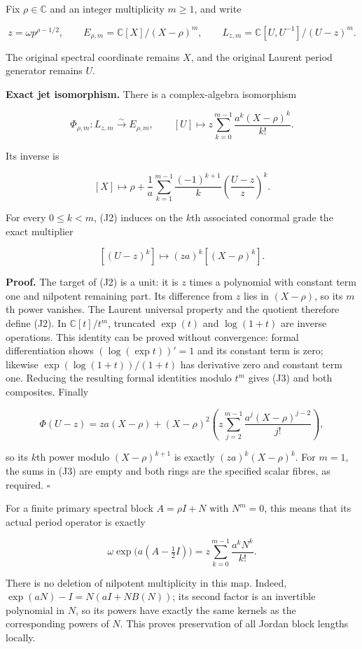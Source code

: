 Fix \(\rho\in\mathbb C\) and an integer multiplicity \(m\ge 1\), and write

\[
z=\omega p^{\rho-1/2},\qquad
E_{\rho,m}=\mathbb C[X]/(X-\rho)^m,
\qquad
L_{z,m}=\mathbb C[U,U^{-1}]/(U-z)^m.
\]

The original spectral coordinate remains \(X\), and the original Laurent period generator remains \(U\).

\textbf{Exact jet isomorphism.} There is a complex-algebra isomorphism

\[
\Phi_{\rho,m}:L_{z,m}\xrightarrow{\sim}E_{\rho,m},
\qquad
[U]\longmapsto z\sum_{k=0}^{m-1}\frac{a^k(X-\rho)^k}{k!}.
\tag{J2}
\]

Its inverse is

\[
[X]\longmapsto\rho+
\frac1a\sum_{k=1}^{m-1}\frac{(-1)^{k+1}}k
\left(\frac{U-z}{z}\right)^k.
\tag{J3}
\]

For every \(0\le k<m\), (J2) induces on the \(k\)th associated conormal grade the exact multiplier

\[
[(U-z)^k]\longmapsto (za)^k[(X-\rho)^k].
\tag{J4}
\]

\textbf{Proof.} The target of (J2) is a unit: it is \(z\) times a polynomial with constant term one and nilpotent remaining part. Its difference from \(z\) lies in \((X-\rho )\), so its \(m\)th power vanishes. The Laurent universal property and the quotient therefore define (J2). In \(\mathbb C[t]/t^m\), truncated \(\exp(t)\) and \(\log(1+t)\) are inverse operations. This identity can be proved without convergence: formal differentiation shows \((\log(\exp t))'=1\) and its constant term is zero; likewise \(\exp(\log(1+t))/(1+t)\) has derivative zero and constant term one. Reducing the resulting formal identities modulo \(t^m\) gives (J3) and both composites. Finally

\[
\Phi(U-z)=za(X-\rho)+(X-\rho)^2
\left(z\sum_{j=2}^{m-1}\frac{a^j(X-\rho)^{j-2}}{j!}\right),
\]

so its \(k\)th power modulo \((X-\rho )^{k+1}\) is exactly \((za)^k(X-\rho )^k\). For \(m=1\), the sums in (J3) are empty and both rings are the specified scalar fibres, as required. \(\square\)

For a finite primary spectral block \(A=\rho I+N\) with \(N^m=0\), this means that its actual period operator is exactly

\[
\omega\exp\bigl(a(A-\tfrac12I)\bigr)
=z\sum_{k=0}^{m-1}\frac{a^kN^k}{k!}.
\tag{J5}
\]

There is no deletion of nilpotent multiplicity in this map. Indeed, \(\exp(aN)-I=N(aI+N B(N))\); its second factor is an invertible polynomial in \(N\), so its powers have exactly the same kernels as the corresponding powers of \(N\). This proves preservation of all Jordan block lengths locally.

